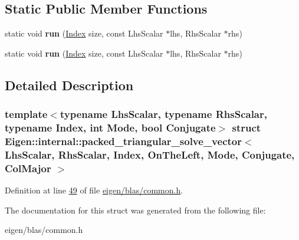 \subsection*{Static Public Member Functions}
\begin{DoxyCompactItemize}
\item 
\mbox{\label{struct_eigen_1_1internal_1_1packed__triangular__solve__vector_3_01_lhs_scalar_00_01_rhs_scalar_04173d9937406f96b80cda304747c263c_a798704f95db8a0b39febca17a9136170}} 
static void {\bfseries run} (\hyperlink{namespace_eigen_a62e77e0933482dafde8fe197d9a2cfde}{Index} size, const Lhs\+Scalar $\ast$lhs, Rhs\+Scalar $\ast$rhs)
\item 
\mbox{\label{struct_eigen_1_1internal_1_1packed__triangular__solve__vector_3_01_lhs_scalar_00_01_rhs_scalar_04173d9937406f96b80cda304747c263c_a798704f95db8a0b39febca17a9136170}} 
static void {\bfseries run} (\hyperlink{namespace_eigen_a62e77e0933482dafde8fe197d9a2cfde}{Index} size, const Lhs\+Scalar $\ast$lhs, Rhs\+Scalar $\ast$rhs)
\end{DoxyCompactItemize}


\subsection{Detailed Description}
\subsubsection*{template$<$typename Lhs\+Scalar, typename Rhs\+Scalar, typename Index, int Mode, bool Conjugate$>$\newline
struct Eigen\+::internal\+::packed\+\_\+triangular\+\_\+solve\+\_\+vector$<$ Lhs\+Scalar, Rhs\+Scalar, Index, On\+The\+Left, Mode, Conjugate, Col\+Major $>$}



Definition at line \hyperlink{eigen_2blas_2common_8h_source_l00049}{49} of file \hyperlink{eigen_2blas_2common_8h_source}{eigen/blas/common.\+h}.



The documentation for this struct was generated from the following file\+:\begin{DoxyCompactItemize}
\item 
eigen/blas/common.\+h\end{DoxyCompactItemize}
